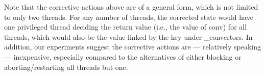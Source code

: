 
Note that the corrective actions above are of a general form, which is not limited to only two threads. For any number of threads, the corrected state would have one privileged thread deciding the return value (i.e., the value of {\sf conv}) for all threads, which would also be the value linked by the key under {\sf \_convertors}. In addition, our experiments suggest the corrective actions are --- relatively speaking --- inexpensive, especially compared to the alternatives of either blocking or aborting/restarting all threads but one.

